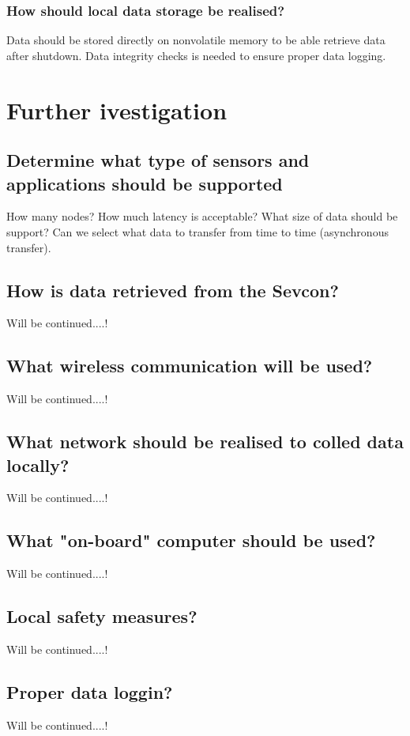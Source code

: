 \subsubsection*{How should local data storage be realised?}
Data should be stored directly on nonvolatile memory to be able retrieve data after shutdown.
Data integrity checks is needed to ensure proper data logging.


\section{Further ivestigation}


\subsection{Determine what type of sensors and applications should be supported}
How many nodes? How much latency is acceptable? What size of data should be support? Can we select what data to transfer from time to time (asynchronous transfer).

\subsection{How is data retrieved from the Sevcon?}
Will be continued....! 

\subsection{What wireless communication will be used?}
Will be continued....!

\subsection{What network should be realised to colled data locally?}
Will be continued....!

\subsection{What "on-board" computer should be used?}
Will be continued....!

\subsection{Local safety measures?}
Will be continued....!

\subsection{Proper data loggin?}
Will be continued....!

